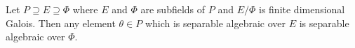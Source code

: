 Let $P \supseteq E \supseteq \Phi$ where $E$ and $\Phi$ are subfields of $P$ and $E/\Phi$ is finite dimensional Galois. Then any element $\theta \in P$ which is separable algebraic over $E$ is separable algebraic over $\Phi$.
